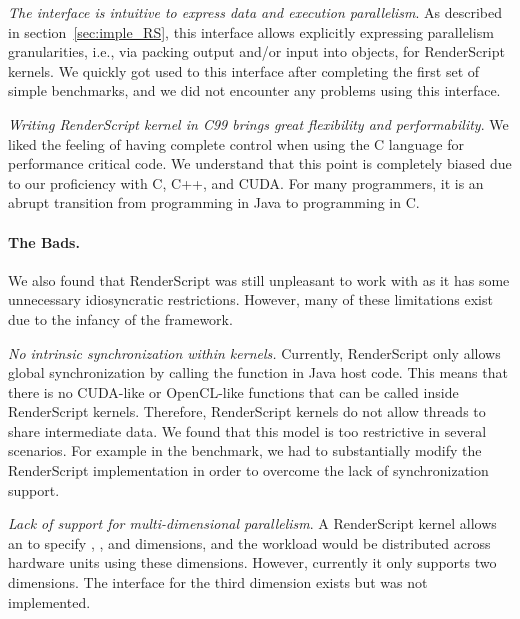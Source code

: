 \textit{The  interface is intuitive to express data and
execution parallelism}. As described in section~\ref{sec:imple_RS}, this
 interface allows explicitly expressing parallelism
granularities, i.e., via packing output and/or input into  objects,
for RenderScript kernels.  We quickly got used to this interface
after completing the first set of simple benchmarks, and we did not encounter
any problems using this interface.

\textit{Writing RenderScript kernel in C99 brings great flexibility and
performability}. We
liked the feeling of having complete control when using
the C language for performance critical code. We understand that this point is
completely biased due to our proficiency with C, C++, and CUDA. For many
programmers, it is an abrupt transition from programming in Java to programming
in C.


\paragraph{The Bads.} We also found that RenderScript was still unpleasant to
work with as it has some unnecessary idiosyncratic restrictions. However, many
of these limitations exist due to the
infancy of the framework.

\textit{No intrinsic synchronization within kernels.} Currently, RenderScript
only allows global synchronization by calling the  function in
Java host code. This means that there is no CUDA-like  or
OpenCL-like  functions that can be called inside RenderScript
kernels. Therefore, RenderScript kernels do not allow threads to share
intermediate data. We found that this model is too restrictive in several
scenarios. For example in the  benchmark, we had to substantially
modify the RenderScript  implementation in order
to overcome the lack of
synchronization support.

\textit{Lack of support for multi-dimensional parallelism}. A RenderScript
kernel allows an  to specify , , and 
dimensions, and the workload would be distributed across hardware units using
these dimensions. However, currently it only supports two
dimensions. The interface for the third dimension exists but was not
implemented.

